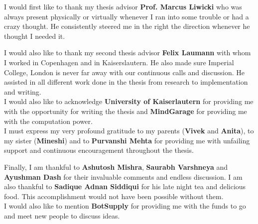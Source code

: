 
\begin{acknowledgements}      

I would first like to thank my thesis advisor \textbf{Prof. Marcus Liwicki} who was always present physically or virtually whenever I ran into some trouble or had a crazy thought. He consistently steered me in the right the direction whenever he thought I needed it.

I would also like to thank my second thesis advisor \textbf{Felix Laumann} with whom I worked in Copenhagen and in Kaiserslautern. He also made sure Imperial College, London is never far away with our continuous calls and discussion. He assisted in all different work done in the thesis from research to implementation and writing.\\

I would also like to acknowledge \textbf{University of Kaiserlautern} for providing me with the opportunity for writing the thesis and \textbf{MindGarage} for providing me with the computation power.\\

I must express my very profound gratitude to my parents (\textbf{Vivek} and \textbf{Anita}), to my sister (\textbf{Mineshi}) and to \textbf{Purvanshi Mehta} for providing me with unfailing support and continuous encouragement throughout the thesis. 

Finally, I am thankful to \textbf{Ashutosh Mishra}, \textbf{Saurabh Varshneya} and \textbf{Ayushman Dash} for their invaluable comments and endless discussion. I am also thankful to \textbf{Sadique Adnan Siddiqui} for his late night tea and delicious food. This accomplishment would not have been possible without them. \\

I would also like to mention \textbf{BotSupply} for providing me with the funds to go and meet new people to discuss ideas. \\ \\



\end{acknowledgements}
